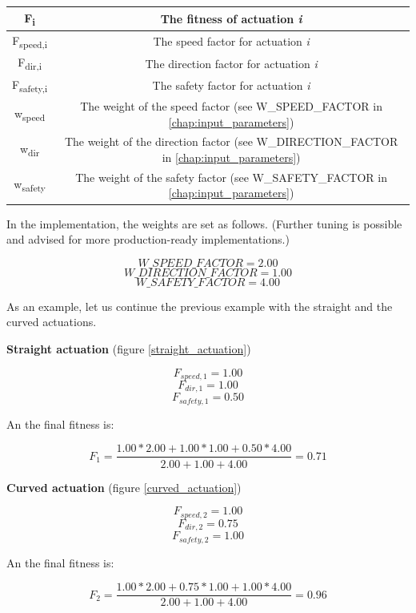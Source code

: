 {\begin{center}
    \begin{tabular}{ | c | c | }
        \hline
        F\textsubscript{i}  		& The fitness of actuation \textit{i}															\\
        \hline
        F\textsubscript{speed,i}  	& The speed factor for actuation \textit{i}														\\
        \hline
        F\textsubscript{dir,i}  	& The direction factor for actuation \textit{i}													\\
        \hline
        F\textsubscript{safety,i}  	& The safety factor for actuation \textit{i}													\\
        \hline
        w\textsubscript{speed}  	& The weight of the speed factor (see W\_SPEED\_FACTOR in \ref{chap:input_parameters})			\\
        \hline
        w\textsubscript{dir}  		& The weight of the direction factor (see W\_DIRECTION\_FACTOR in \ref{chap:input_parameters})	\\
        \hline
        w\textsubscript{safety}  	& The weight of the safety factor (see W\_SAFETY\_FACTOR in \ref{chap:input_parameters})		\\
        \hline
    \end{tabular}
\end{center}

In the implementation, the weights are set as follows. (Further tuning is possible and advised for more production-ready implementations.)

\[ W\_SPEED\_FACTOR = 2.00 \]
\[ W\_DIRECTION\_FACTOR = 1.00 \]
\[ W\_SAFETY\_FACTOR = 4.00 \]

As an example, let us continue the previous example with the straight and the curved actuations.

\textbf{Straight actuation} (figure \ref{straight_actuation})

\[ F_{speed,1} = 1.00 \]
\[ F_{dir,1} = 1.00 \]
\[ F_{safety,1} = 0.50 \]

An the final fitness is:

\[ F_{1} = \frac{1.00 * 2.00 + 1.00 * 1.00 + 0.50 * 4.00}{2.00 + 1.00 + 4.00} = 0.71 \]

\textbf{Curved actuation} (figure \ref{curved_actuation})

\[ F_{speed,2} = 1.00 \]
\[ F_{dir,2} = 0.75 \]
\[ F_{safety,2} = 1.00 \]

An the final fitness is:

\[ F_{2} = \frac{1.00 * 2.00 + 0.75 * 1.00 + 1.00 * 4.00}{2.00 + 1.00 + 4.00} = 0.96 \]

}
